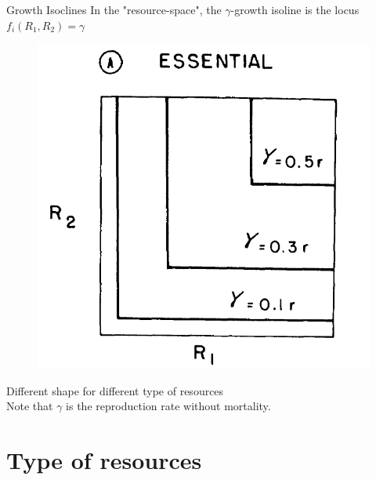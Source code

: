 \documentclass[final,xcolor=dvipsnames]{beamer}
\begin{document}
\begin{frame}{Growth Isoclines}
In the "resource-space", the $\gamma$-growth isoline is the locus $f_i(R_1,R_2)=\gamma$
\begin{figure}
\includegraphics[width=.4\framewidth]{Essential1}
\end{figure}
Different shape for different type of resources\\
Note that $\gamma$ is the reproduction rate without mortality.
\end{frame}

\section{Type of resources}
\end{document}
